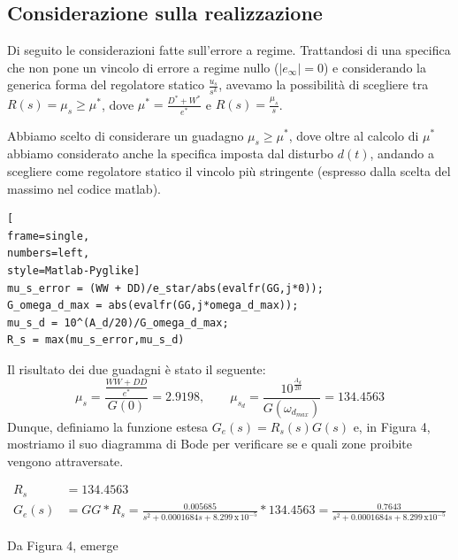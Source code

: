 \documentclass[a4paper, 11pt]{article}
\begin{document}
\subsection{\textbf{Considerazione sulla realizzazione}}
Di seguito le considerazioni fatte sull'errore a regime. Trattandosi di una specifica che non pone un vincolo di errore a regime nullo ($|e_{\infty}| = 0$) e considerando la generica forma del regolatore statico $\frac{u_s}{s^k}$, avevamo la possibilità di scegliere tra $R(s) = \mu_s \ge \mu^*$, dove $\mu^* = \frac{D^* + W^*}{e^*}$ e $R(s) = \frac{\mu_s}{s}$.

\vspace{0.2 cm}

Abbiamo scelto di considerare un guadagno $\mu_s \ge \mu^*$, dove oltre al calcolo di $\mu^*$ abbiamo considerato anche la specifica imposta dal disturbo $d(t)$, andando a scegliere come regolatore statico il vincolo più stringente (espresso dalla scelta del massimo nel codice matlab).

\vspace{0.2 cm}

\begin{lstlisting}[
frame=single,
numbers=left,
style=Matlab-Pyglike]
mu_s_error = (WW + DD)/e_star/abs(evalfr(GG,j*0));
G_omega_d_max = abs(evalfr(GG,j*omega_d_max));
mu_s_d = 10^(A_d/20)/G_omega_d_max;
R_s = max(mu_s_error,mu_s_d)
\end{lstlisting}

Il risultato dei due guadagni è stato il seguente:
\vspace{0.2 cm}
$$\mu_s = \frac{\frac{WW + DD}{e^*}}{G(0)} = 2.9198, \qquad \mu_{s_d} = \frac{10^{\frac{A_d}{20}}}{G(\omega_{d_{max}})} = 134.4563$$ 
Dunque, definiamo la funzione estesa $G_e(s) = R_s(s)G(s)$ e, in Figura 4, mostriamo il suo diagramma di Bode per verificare se e quali zone proibite vengono attraversate.




\begin{align}
R_s & = 134.4563
\\
G_e(s) & =  GG *R_s = \frac{0.005685}{s^2 + 0.0001684 s + 8.299 \,\mbox{x}\, 10^{-5}} * 134.4563 =   \frac{0.7643}{s^2 + 0.0001684 s + 8.299\,\mbox{x}10^{-5}}
\end{align}

Da Figura 4, emerge
\end{document}
